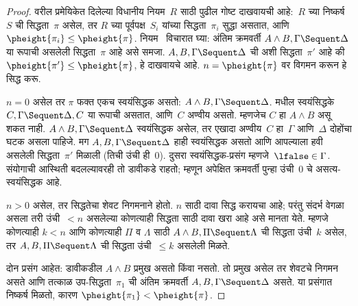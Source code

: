 \begin{proof}
वरील प्रमेयिकेत दिलेल्या विधानीय नियम~$R$ साठी पुढील
गोष्ट दाखवायची आहे:~$R$ च्या निष्कर्ष~$S$ ची
सिद्धता~$\pi$ असेल, तर $R$ च्या पूर्वपक्ष~$S_i$
यांच्या सिद्धता~$\pi_i$ सुद्धा असतात, आणि
$\pheight{\pi_i}
\le \pheight{\pi}$. नियम~\LeftR{\land} विचारात घ्या:
अंतिम क्रमवर्ती $A \land B, \Gamma
\Sequent \Delta$ या रूपाची असलेली सिद्धता~$\pi$
आहे असे समजा. $A, B, \Gamma \Sequent \Delta$
ची अशी सिद्धता~$\pi'$ आहे की $\pheight{\pi'} \le
\pheight{\pi}$, हे दाखवायचे आहे. $n = \pheight{\pi}$
वर विगमन करून हे सिद्ध करू.

$n = 0$ असेल तर $\pi$ फक्त एकच स्वयंसिद्धक
असतो: $A \land B, \Gamma
\Sequent \Delta$.  मधील स्वयंसिद्धके
$C, \Gamma
\Sequent \Delta, C$ या रूपाची असतात, आणि~$C$
अण्वीय असतो. म्हणजेच $C$ हा $A \land B$
असू शकत नाही. $A \land B, \Gamma \Sequent \Delta$
स्वयंसिद्धक असेल, तर एखादा अण्वीय~$C$ हा~$\Gamma$
आणि~$\Delta$ दोहोंचा घटक असला पाहिजे.
मग $A, B, \Gamma \Sequent \Delta$ हाही
स्वयंसिद्धक असतो आणि आपल्याला हवी असलेली
सिद्धता~$\pi'$ मिळाली (तिची उंची ही~$0$).
दुसरा स्वयंसिद्धक-प्रसंग म्हणजे~$\lfalse\in\Gamma$.
संयोगाची आस्थिती बदलल्यावरही तो डावीकडे राहतो;
म्हणून अपेक्षित क्रमवर्ती पुन्हा उंची~$0$ चे
असत्य-स्वयंसिद्धक आहे.

$n>0$ असेल, तर सिद्धतेचा शेवट निगमनाने
होतो. $n$ साठी दावा सिद्ध करायचा आहे; परंतु संदर्भ
वेगळा असला तरी उंची~$<n$ असलेल्या कोणत्याही
सिद्धता साठी दावा खरा आहे असे मानता येते. म्हणजे
कोणत्याही $k<n$ आणि कोणत्याही $\Pi$ व $\Lambda$
साठी $A \land B, \Pi \Sequent \Lambda$ ची
सिद्धता उंची~$k$ असेल, तर $A, B, \Pi
\Sequent \Lambda$ ची सिद्धता उंची~$\le k$
असलेली मिळते.

दोन प्रसंग आहेत: डावीकडील $A \land
B$ प्रमुख असतो किंवा नसतो. तो प्रमुख असेल तर
शेवटचे निगमन~\LeftR{\land} असते आणि तत्काळ
उप-सिद्धता~$\pi_1$ ची अंतिम क्रमवर्ती
$A, B, \Gamma \Sequent \Delta$ असते. या
प्रसंगात निष्कर्ष मिळतो, कारण $\pheight{\pi_1} <
\pheight{\pi}$.


\end{proof}
